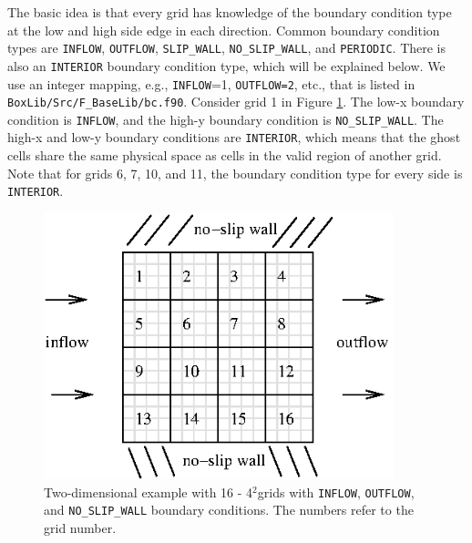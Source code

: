The basic idea is that every grid has knowledge of the
boundary condition type at the low and high side edge in each direction.
Common boundary condition types are {\tt INFLOW}, {\tt OUTFLOW}, {\tt SLIP\_WALL},
{\tt NO\_SLIP\_WALL}, and {\tt PERIODIC}.
There is also an {\tt INTERIOR} boundary condition type, which 
will be explained below.  We use an integer mapping, e.g., {\tt INFLOW}=1,
{\tt OUTFLOW=2}, etc., that is listed in {\tt BoxLib/Src/F\_BaseLib/bc.f90}.
Consider grid 1 in Figure \ref{fig:bc_example1}.  The
low-x boundary condition is {\tt INFLOW}, and the high-y boundary condition is
{\tt NO\_SLIP\_WALL}.  The high-x and low-y boundary conditions are {\tt INTERIOR}, which
means that the ghost cells share the same physical space as cells in the valid region of 
another grid.  Note that for grids 6, 7, 10, and 11, the boundary condition type for
every side is {\tt INTERIOR}.
\begin{figure}[tb]
\centering
\includegraphics[width=4in]{./AdvancedTopics/bc_example1}
\caption{\label{fig:bc_example1}Two-dimensional example with 16 - 4$^2$grids with
{\tt INFLOW}, {\tt OUTFLOW}, and {\tt NO\_SLIP\_WALL} boundary conditions.
The numbers refer to the grid number.}
\end{figure}

